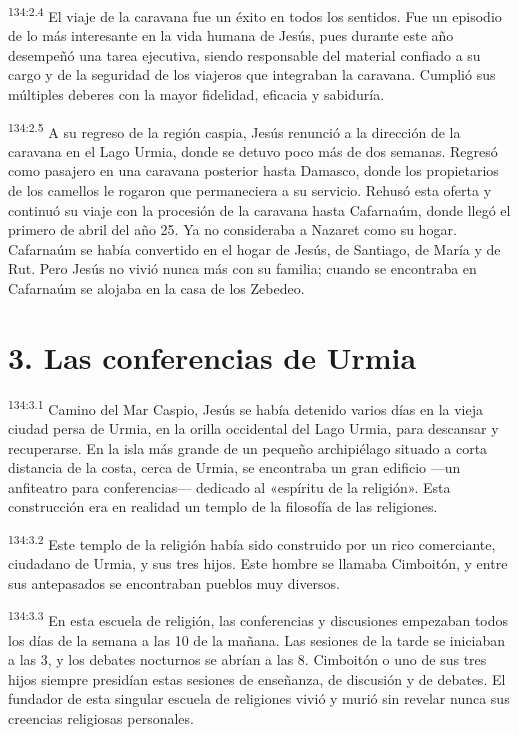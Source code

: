 \par 
\textsuperscript{134:2.4} El viaje de la caravana fue un éxito en todos los sentidos. Fue un episodio de lo más interesante en la vida humana de Jesús, pues durante este año desempeñó una tarea ejecutiva, siendo responsable del material confiado a su cargo y de la seguridad de los viajeros que integraban la caravana. Cumplió sus múltiples deberes con la mayor fidelidad, eficacia y sabiduría.

\par 
\textsuperscript{134:2.5} A su regreso de la región caspia, Jesús renunció a la dirección de la caravana en el Lago Urmia, donde se detuvo poco más de dos semanas. Regresó como pasajero en una caravana posterior hasta Damasco, donde los propietarios de los camellos le rogaron que permaneciera a su servicio. Rehusó esta oferta y continuó su viaje con la procesión de la caravana hasta Cafarnaúm, donde llegó el primero de abril del año 25. Ya no consideraba a Nazaret como su hogar. Cafarnaúm se había convertido en el hogar de Jesús, de Santiago, de María y de Rut. Pero Jesús no vivió nunca más con su familia; cuando se encontraba en Cafarnaúm se alojaba en la casa de los Zebedeo.

\section*{3. Las conferencias de Urmia}
\par 
\textsuperscript{134:3.1} Camino del Mar Caspio, Jesús se había detenido varios días en la vieja ciudad persa de Urmia, en la orilla occidental del Lago Urmia, para descansar y recuperarse. En la isla más grande de un pequeño archipiélago situado a corta distancia de la costa, cerca de Urmia, se encontraba un gran edificio ---un anfiteatro para conferencias--- dedicado al «espíritu de la religión». Esta construcción era en realidad un templo de la filosofía de las religiones.

\par 
\textsuperscript{134:3.2} Este templo de la religión había sido construido por un rico comerciante, ciudadano de Urmia, y sus tres hijos. Este hombre se llamaba Cimboitón, y entre sus antepasados se encontraban pueblos muy diversos.

\par 
\textsuperscript{134:3.3} En esta escuela de religión, las conferencias y discusiones empezaban todos los días de la semana a las 10 de la mañana. Las sesiones de la tarde se iniciaban a las 3, y los debates nocturnos se abrían a las 8. Cimboitón o uno de sus tres hijos siempre presidían estas sesiones de enseñanza, de discusión y de debates. El fundador de esta singular escuela de religiones vivió y murió sin revelar nunca sus creencias religiosas personales.

